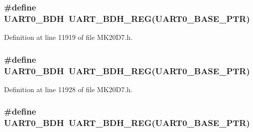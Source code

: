 \subsubsection[{\texorpdfstring{U\+A\+R\+T0\+\_\+\+B\+DH}{UART0_BDH}}]{\setlength{\rightskip}{0pt plus 5cm}\#define U\+A\+R\+T0\+\_\+\+B\+DH~{\bf U\+A\+R\+T\+\_\+\+B\+D\+H\+\_\+\+R\+EG}({\bf U\+A\+R\+T0\+\_\+\+B\+A\+S\+E\+\_\+\+P\+TR})}\hypertarget{group___u_a_r_t___register___accessor___macros_ga0f086bea96574c5a4b90ff7ce1a99256}{}\label{group___u_a_r_t___register___accessor___macros_ga0f086bea96574c5a4b90ff7ce1a99256}


Definition at line 11919 of file M\+K20\+D7.\+h.

\subsubsection[{\texorpdfstring{U\+A\+R\+T0\+\_\+\+B\+DH}{UART0_BDH}}]{\setlength{\rightskip}{0pt plus 5cm}\#define U\+A\+R\+T0\+\_\+\+B\+DH~{\bf U\+A\+R\+T\+\_\+\+B\+D\+H\+\_\+\+R\+EG}({\bf U\+A\+R\+T0\+\_\+\+B\+A\+S\+E\+\_\+\+P\+TR})}\hypertarget{group___u_a_r_t___register___accessor___macros_ga0f086bea96574c5a4b90ff7ce1a99256}{}\label{group___u_a_r_t___register___accessor___macros_ga0f086bea96574c5a4b90ff7ce1a99256}


Definition at line 11928 of file M\+K20\+D7.\+h.

\subsubsection[{\texorpdfstring{U\+A\+R\+T0\+\_\+\+B\+DH}{UART0_BDH}}]{\setlength{\rightskip}{0pt plus 5cm}\#define U\+A\+R\+T0\+\_\+\+B\+DH~{\bf U\+A\+R\+T\+\_\+\+B\+D\+H\+\_\+\+R\+EG}({\bf U\+A\+R\+T0\+\_\+\+B\+A\+S\+E\+\_\+\+P\+TR})}\hypertarget{group___u_a_r_t___register___accessor___macros_ga0f086bea96574c5a4b90ff7ce1a99256}{}\label{group___u_a_r_t___register___accessor___macros_ga0f086bea96574c5a4b90ff7ce1a99256}


